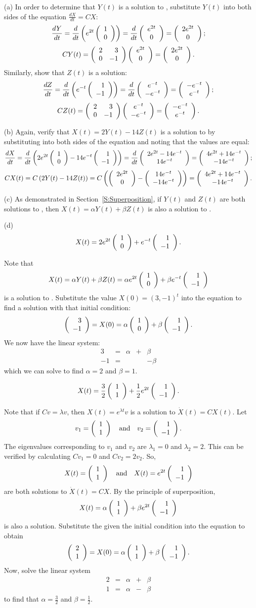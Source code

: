 (a) In order to determine that $Y(t)$ is a solution
to , substitute $Y(t)$ into both sides of the 
equation $\frac{dX}{dt} = CX$:
\[
\frac{dY}{dt}
= \frac{d}{dt}\left(e^{2t}\left(\begin{array}{r} 1 \\ 0\end{array}\right)\right)
= \frac{d}{dt}\left(\begin{array}{c} e^{2t} \\ 0\end{array}\right)
= \left(\begin{array}{c} 2e^{2t} \\ 0\end{array}\right);
\]
\[
CY(t)
= \left(\begin{array}{rr} 2 & 3\\ 0 &-1\end{array}\right)\left(\begin{array}{c} e^{2t} \\ 0\end{array}\right)
= \left(\begin{array}{c} 2e^{2t} \\ 0\end{array}\right).
\]
Similarly, show that $Z(t)$ is a solution:
\[
\frac{dZ}{dt}
= \frac{d}{dt}\left(e^{-t}\left(\begin{array}{r} 1 \\ -1\end{array}\right)\right)
= \frac{d}{dt}\left(\begin{array}{c} e^{-t} \\ -e^{-t}\end{array}\right)
= \left(\begin{array}{c} -e^{-t} \\ e^{-t}\end{array}\right);
\]
\[
CZ(t)
= \left(\begin{array}{rr} 2 & 3\\ 0 &-1\end{array}\right)\left(\begin{array}{c} e^{-t} \\ -e^{-t}\end{array}\right)
= \left(\begin{array}{c} -e^{-t} \\ e^{-t}\end{array}\right).
\]

(b) Again, verify that $X(t) = 2Y(t) - 14Z(t)$ is a solution to
 by substituting into both sides of the equation and
noting that the values are equal:
\[
\frac{dX}{dt}
= \frac{d}{dt}\left(2e^{2t}\left(\begin{array}{r} 1 \\ 0\end{array}\right) - 14e^{-t}\left(\begin{array}{r} 1 \\ -1\end{array}\right)\right)
= \frac{d}{dt}\left(\begin{array}{c} 2e^{2t} - 14e^{-t} \\ 14e^{-t}\end{array}\right) 
= \left(\begin{array}{c} 4e^{2t} + 14e^{-t} \\ -14e^{-t}\end{array}\right);
\]
\[
CX(t) = C\left(2Y(t) - 14Z(t)\right)
= C\left(\left(\begin{array}{c} 2e^{2t} \\ 0\end{array}\right) - \left(\begin{array}{c} 14e^{-t} \\ -14e^{-t}\end{array}\right)\right)
= \left(\begin{array}{c} 4e^{2t} + 14e^{-t} \\ -14e^{-t}\end{array}\right).
\]

(c) As demonstrated in Section~\ref{S:Superposition}, if
$Y(t)$ and $Z(t)$ are both solutions to
, then $X(t) = \alpha Y(t) + \beta Z(t)$ is also
a solution to .

(d) \ans 
\[
X(t) = 2e^{2t}\left(\begin{array}{r} 1 \\ 0\end{array}\right) + e^{-t}\left(\begin{array}{r} 1 \\ -1\end{array}\right).
\]

\soln Note that
\[ X(t) = \alpha Y(t) + \beta Z(t) = \alpha e^{2t}\left(\begin{array}{r} 1 \\ 0\end{array}\right)
+ \beta e^{-t}\left(\begin{array}{r} 1 \\ -1\end{array}\right) \]
is a solution to .  Substitute the value
$X(0) = (3,-1)^t$  into the equation to find a solution with that
initial condition:
\[
\left(\begin{array}{r} 3 \\ -1\end{array}\right) = X(0) = \alpha\left(\begin{array}{r} 1 \\ 0\end{array}\right) +
\beta\left(\begin{array}{r} 1 \\ -1\end{array}\right).
\]
We now have the linear system:
\[ \begin{array}{rrrrr}
3 & = & \alpha & + & \beta \\
-1 & = & & & -\beta \end{array} \]
which we can solve to find $\alpha = 2$ and $\beta = 1$.


\ans 
\[
X(t) = \frac{3}{2}\left(\begin{array}{r} 1 \\ 1\end{array}\right) + \frac{1}{2}e^{2t}\left(\begin{array}{r} 1 \\ -1\end{array}\right).
\]

\soln Note that if $Cv = \lambda v$, then $X(t) = e^{\lambda t}v$ is a
solution to $\dot{X}(t) = CX(t)$.  Let
\[
v_1 = \left(\begin{array}{r} 1 \\ 1\end{array}\right) \quad\mbox{and}\quad v_2 = \left(\begin{array}{r} 1 \\ -1\end{array}\right).
\]
The eigenvalues corresponding to $v_1$ and $v_2$ are
$\lambda_1 = 0$ and $\lambda_2 = 2$.  This can be verified
by calculating $Cv_1 = 0$ and $Cv_2 = 2v_2$.
So,
\[
X(t) = \left(\begin{array}{r} 1 \\ 1\end{array}\right) \quad\mbox{and}\quad X(t) = e^{2t}\left(\begin{array}{r} 1 \\ -1\end{array}\right)
\]
are both solutions to $\dot{X}(t) = CX$.  By the principle of
superposition,
\[
X(t) = \alpha\left(\begin{array}{r} 1 \\ 1\end{array}\right) + \beta e^{2t}\left(\begin{array}{r} 1 \\ -1\end{array}\right)
\]
is also a solution.
Substitute the given the initial condition into the equation to obtain
\[
\left(\begin{array}{r} 2 \\ 1\end{array}\right) = X(0) = \alpha\left(\begin{array}{r} 1 \\ 1\end{array}\right) + \beta\left(\begin{array}{r} 1 \\ -1\end{array}\right).
\]
Now, solve the linear system
\[
\begin{array}{rrrrr}
2 & = & \alpha & + & \beta \\
1 & = & \alpha & - & \beta \end{array}
\]
to find that $\alpha = \frac{3}{2}$ and $\beta = \frac{1}{2}$.


